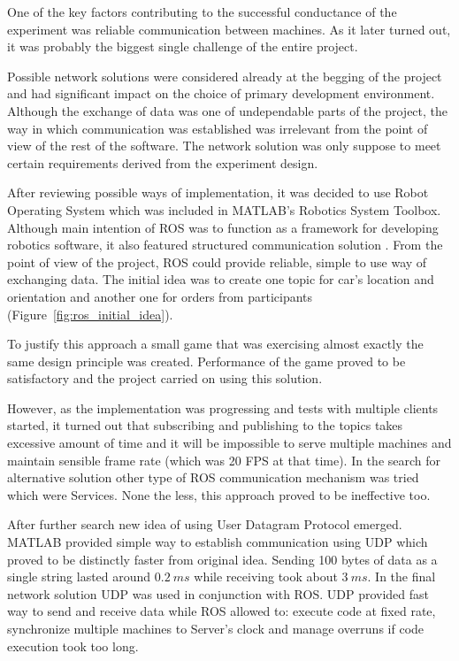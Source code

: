\documentclass[11pt,english]{article}
\begin{document}
One of the key factors contributing to the successful conductance of the experiment was reliable communication between machines. As it later turned out, it was probably the biggest single challenge of the entire project.
\par
Possible network solutions were considered already at the begging of the project and had significant impact on the choice of primary development environment. Although the exchange of data was one of undependable parts of the project, the way in which communication was established was irrelevant from the point of view of the rest of the software. The network solution was only suppose to meet certain requirements derived from the experiment design.
\par
 After reviewing possible ways of implementation, it was decided to use Robot Operating System which was included in MATLAB's Robotics System Toolbox. Although main intention of ROS was to function as a framework for developing robotics software, it also featured  structured communication solution \citep{quigley2009ros}. From the point of view of the project, ROS could provide reliable, simple to use way of exchanging data. The initial idea was to create one topic for car's location and orientation and another one for orders from participants (Figure~\ref{fig:ros_initial_idea}). 
\par
To justify this approach a small game that was exercising almost exactly the same design principle was created. Performance of the game proved to be satisfactory and the project carried on using this solution. 
\par
However, as the implementation was progressing and tests with multiple clients started, it turned out that subscribing and publishing to the topics takes excessive amount of time and it will be impossible to serve multiple machines and maintain sensible frame rate (which was 20 FPS at that time). In the search for alternative solution other type of ROS communication mechanism was tried which were Services. None the less, this approach proved to be ineffective too. 
\par
After further search new idea of using User Datagram Protocol emerged. MATLAB provided simple way to establish communication using UDP which proved to be distinctly faster from original idea. Sending 100 bytes of data as a single string lasted around $0.2\:ms$ while receiving took about $3\:ms$. 
In the final network solution UDP was used in conjunction with ROS. UDP provided fast way to send and receive data while ROS allowed to: execute code at fixed rate, synchronize multiple machines to Server's clock and manage overruns if code execution took too long. 
\end{document}
